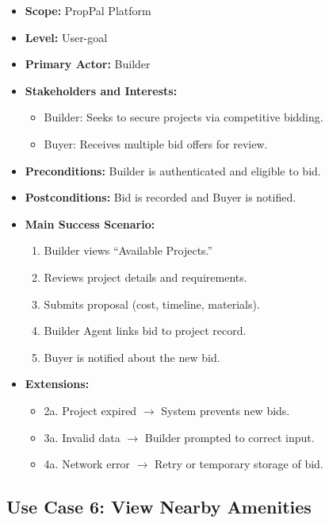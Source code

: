 \begin{itemize}
    \item \textbf{Scope:} PropPal Platform
    \item \textbf{Level:} User-goal
    \item \textbf{Primary Actor:} Builder
    \item \textbf{Stakeholders and Interests:}
    \begin{itemize}
        \item Builder: Seeks to secure projects via competitive bidding.
        \item Buyer: Receives multiple bid offers for review.
    \end{itemize}
    \item \textbf{Preconditions:} Builder is authenticated and eligible to bid.
    \item \textbf{Postconditions:} Bid is recorded and Buyer is notified.
    \item \textbf{Main Success Scenario:}
    \begin{enumerate}
        \item Builder views ``Available Projects.''
        \item Reviews project details and requirements.
        \item Submits proposal (cost, timeline, materials).
        \item Builder Agent links bid to project record.
        \item Buyer is notified about the new bid.
    \end{enumerate}
    \item \textbf{Extensions:}
    \begin{itemize}
        \item 2a. Project expired $\rightarrow$ System prevents new bids.
        \item 3a. Invalid data $\rightarrow$ Builder prompted to correct input.
        \item 4a. Network error $\rightarrow$ Retry or temporary storage of bid.
    \end{itemize}
\end{itemize}

\subsection{Use Case 6: View Nearby Amenities}

